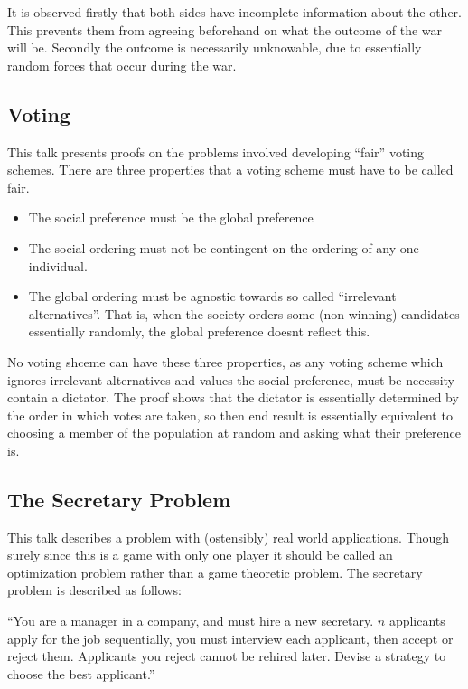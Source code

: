 \documentclass{article}
\begin{document}
It is observed firstly that both sides have incomplete information about the other.
This prevents them from agreeing beforehand on what the outcome of the war will be.
Secondly the outcome is necessarily unknowable, due to essentially random forces that occur during the war.

\subsection{Voting}

This talk presents proofs on the problems involved developing ``fair'' voting schemes.
There are three properties that a voting scheme must have to be called fair.
\begin{itemize}
	\item The social preference must be the global preference
	\item The social ordering must not be contingent on the ordering of any one individual.
	\item The global ordering must be agnostic towards so called ``irrelevant alternatives''.
			That is, when the society orders some (non winning) candidates essentially randomly, the global preference doesnt reflect this.
\end{itemize}

No voting shceme can have these three properties, as any voting scheme which ignores irrelevant alternatives and values the social preference, must be necessity contain a dictator.
The proof shows that the dictator is essentially determined by the order in which votes are taken, so then end result is essentially equivalent to choosing a member of the population at random and asking what their preference is.

\subsection{The Secretary Problem}

This talk describes a problem with (ostensibly) real world applications.
Though surely since this is a game with only one player it should be called an optimization problem rather than a game theoretic problem.
The secretary problem is described as follows:

``You are a manager in a company, and must hire a new secretary.
$n$ applicants apply for the job sequentially, you must interview each applicant, then accept or reject them.
Applicants you reject cannot be rehired later.
Devise a strategy to choose the best applicant.''
\end{document}

